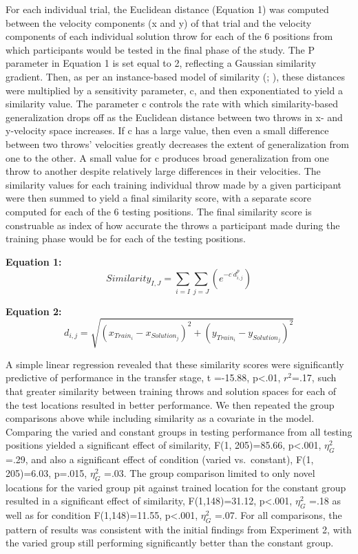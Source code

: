 \documentclass[
  11pt,
  letterpaper,
]{article}
\begin{document}
For each individual trial, the Euclidean distance (Equation 1) was
computed between the velocity components (x and y) of that trial and the
velocity components of each individual solution throw for each of the 6
positions from which participants would be tested in the final phase of
the study. The P parameter in Equation 1 is set equal to 2, reflecting a
Gaussian similarity gradient. Then, as per an instance-based model of
similarity (; ), these distances were multiplied by a sensitivity parameter, c,
and then exponentiated to yield a similarity value. The parameter c
controls the rate with which similarity-based generalization drops off
as the Euclidean distance between two throws in x- and y-velocity space
increases. If c has a large value, then even a small difference between
two throws' velocities greatly decreases the extent of generalization
from one to the other. A small value for c produces broad generalization
from one throw to another despite relatively large differences in their
velocities. The similarity values for each training individual throw
made by a given participant were then summed to yield a final similarity
score, with a separate score computed for each of the 6 testing
positions. The final similarity score is construable as index of how
accurate the throws a participant made during the training phase would
be for each of the testing positions.

\textbf{Equation 1:}
\[ Similarity_{I,J} = \sum_{i=I}\sum_{j=J} (e^{-c^\cdot d^{p}_{i,j}}) \]

\textbf{Equation 2:}
\[ d_{i,j} = \sqrt{(x_{Train_i}-x_{Solution_j})^2 + (y_{Train_i}-y_{Solution_j})^2 } \]

A simple linear regression revealed that these similarity scores were
significantly predictive of performance in the transfer stage, t
=-15.88, p\textless.01, \(r^2\)=.17, such that greater similarity
between training throws and solution spaces for each of the test
locations resulted in better performance. We then repeated the group
comparisons above while including similarity as a covariate in the
model. Comparing the varied and constant groups in testing performance
from all testing positions yielded a significant effect of similarity,
F(1, 205)=85.66, p\textless.001, \(\eta^{2}_G\) =.29, and also a
significant effect of condition (varied vs.~constant), F(1, 205)=6.03,
p=.015, \(\eta^{2}_G\) =.03. The group comparison limited to only novel
locations for the varied group pit against trained location for the
constant group resulted in a significant effect of similarity,
F(1,148)=31.12, p\textless.001, \(\eta^{2}_G\) =.18 as well as for
condition F(1,148)=11.55, p\textless.001, \(\eta^{2}_G\) =.07. For all
comparisons, the pattern of results was consistent with the initial
findings from Experiment 2, with the varied group still performing
significantly better than the constant group.
\end{document}
